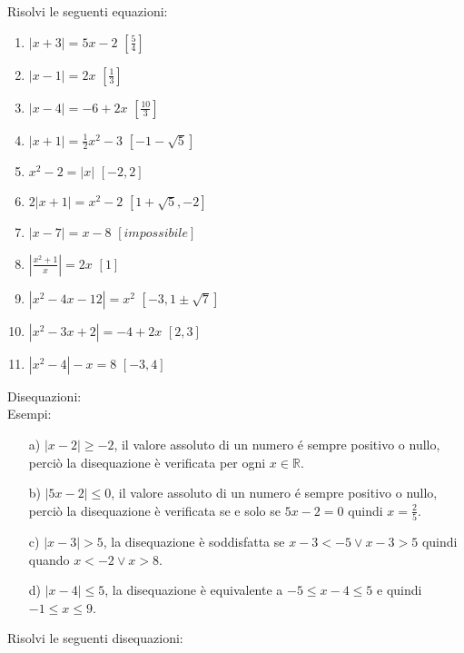 Risolvi le seguenti equazioni:

\begin{enumerate}
\item $\left| x+3 \right| =5x-2 $ \hfill $\left[ \frac{5}{4}\right] $
\item $\left| x-1 \right| =2x $ \hfill $\left[ \frac{1}{3}\right] $
\item $\left| x-4 \right| =-6+2x $ \hfill $\left[ \frac{10}{3}\right] $
\item $\left| x+1 \right| =\frac{1}{2}x^2-3 $ \hfill $\left[ -1-\sqrt{5}\right] 
$
\item $x^2-2= \left| x \right| $ \hfill $\left[ -2, 2\right] $
\item $2\left| x+1 \right| =x^2-2 $ \hfill $\left[1+\sqrt{5}, -2\right] $
\item $\left| x-7 \right| =x-8 $ \hfill $\left[ impossibile\right] $
\item $\left| \frac{x^2+1}{x} \right| =2x $ \hfill $\left[ 1 \right] $
\item $\left| x^2-4x-12 \right| =x^2 $ \hfill $\left[ -3, 1\pm \sqrt{7}\right] $
\item $\left| x^2-3x+2 \right| =-4+2x $ \hfill $\left[ 2, 3\right] $
\item $\left| x^2-4 \right| -x=8 $ \hfill $\left[ -3, 4\right] $
\end{enumerate}


Disequazioni:\\
Esempi:
\begin{enumerate}
        \item[a)] $|x-2|\geq -2$, il valore assoluto di un numero é sempre 
positivo o nullo, perciò la disequazione è verificata per ogni $x\in 
\mathbb{R}$.

        \item[b)] $|5x-2|\leq 0$, il valore assoluto di un numero é sempre 
positivo o nullo, perciò la disequazione è verificata se e solo se $5x-2=0$ 
quindi $x=\frac{2}{5}$.
        \item[c)] $|x-3|>5$, la disequazione è soddisfatta se $x-3<-5 \vee 
x-3>5$ quindi quando $x<-2 \vee x>8$.
        \item[d)] $|x-4|\leq 5$, la disequazione è equivalente a $-5\leq x-4 
\leq 5$ e quindi $-1\leq x \leq 9$.
\end{enumerate}

Risolvi le seguenti disequazioni:


